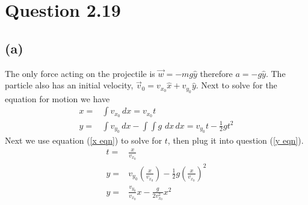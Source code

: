 \documentclass[12pt, a4paper]{article}
\begin{document}
\pagebreak
\section*{Question 2.19}
\subsection*{(a)}
The only force acting on the projectile is $\vec{w} = -mg\hat{y}$ therefore $a = -g\hat{y}$. The particle also has an initial velocity, $\vec{v}_0 = v_{x_0}\hat{x}+v_{y_0}\hat{y}$. Next to solve for the equation for motion we have
\begin{align}
x =& \int v_{x_0}\, dx = \boxed{v_{x_0}t} \label{x eqn}
\\
y =& \int v_{y_0}\, dx - \int\int g \,\, dx \, dx = \boxed{
v_{y_0}t - \tfrac{1}{2}gt^2} \label{y eqn}
\end{align}
Next we use equation (\ref{x eqn}) to solve for $t$, then plug it into question (\ref{y eqn}). 
\begin{align*}
t =& \frac{x}{v_{x_0}}
\\
y =& v_{y_0}\left(\frac{x}{v_{x_0}}\right) - \tfrac{1}{2}g\left(\frac{x}{v_{x_0}}\right)^2
\\
y =& \boxed{\frac{v_{y_0}}{v_{x_0}}x - \frac{g}{2v_{x_0}^2}x^2}
\end{align*}
\pagebreak
\end{document}
